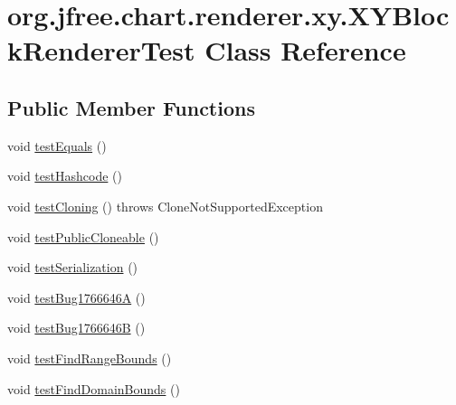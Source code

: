 \hypertarget{classorg_1_1jfree_1_1chart_1_1renderer_1_1xy_1_1_x_y_block_renderer_test}{}\section{org.\+jfree.\+chart.\+renderer.\+xy.\+X\+Y\+Block\+Renderer\+Test Class Reference}
\label{classorg_1_1jfree_1_1chart_1_1renderer_1_1xy_1_1_x_y_block_renderer_test}
\subsection*{Public Member Functions}
\begin{DoxyCompactItemize}
\item 
void \mbox{\hyperlink{classorg_1_1jfree_1_1chart_1_1renderer_1_1xy_1_1_x_y_block_renderer_test_af8810fb808248046cca7b1b2fc06e828}{test\+Equals}} ()
\item 
void \mbox{\hyperlink{classorg_1_1jfree_1_1chart_1_1renderer_1_1xy_1_1_x_y_block_renderer_test_adc7c70ac50dea03085aecc16d5a0aa28}{test\+Hashcode}} ()
\item 
void \mbox{\hyperlink{classorg_1_1jfree_1_1chart_1_1renderer_1_1xy_1_1_x_y_block_renderer_test_aca4a2638df732c7ad81564520df0a92b}{test\+Cloning}} ()  throws Clone\+Not\+Supported\+Exception 
\item 
void \mbox{\hyperlink{classorg_1_1jfree_1_1chart_1_1renderer_1_1xy_1_1_x_y_block_renderer_test_ab10ab18b7e0787dc723f514d46b73ac9}{test\+Public\+Cloneable}} ()
\item 
void \mbox{\hyperlink{classorg_1_1jfree_1_1chart_1_1renderer_1_1xy_1_1_x_y_block_renderer_test_ab00fb5298c13fbe0457dba88f2a86797}{test\+Serialization}} ()
\item 
void \mbox{\hyperlink{classorg_1_1jfree_1_1chart_1_1renderer_1_1xy_1_1_x_y_block_renderer_test_a6de98ad704ede1663b64a5e20611451f}{test\+Bug1766646A}} ()
\item 
void \mbox{\hyperlink{classorg_1_1jfree_1_1chart_1_1renderer_1_1xy_1_1_x_y_block_renderer_test_ae6b1971870e32c02fbe6d9227504c5b2}{test\+Bug1766646B}} ()
\item 
void \mbox{\hyperlink{classorg_1_1jfree_1_1chart_1_1renderer_1_1xy_1_1_x_y_block_renderer_test_a8f67e70dcc5e72a58f5c673a4232c186}{test\+Find\+Range\+Bounds}} ()
\item 
void \mbox{\hyperlink{classorg_1_1jfree_1_1chart_1_1renderer_1_1xy_1_1_x_y_block_renderer_test_a7f0f0202b606c3f552effe368f655833}{test\+Find\+Domain\+Bounds}} ()
\end{DoxyCompactItemize}


